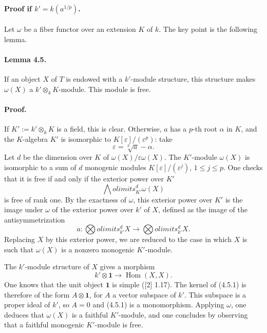 \documentclass[11pt]{article}
\newcommand{\Hom}{\operatorname{Hom}}
\newcommand{\one}{\mathbf{1}}
\theoremstyle{plain}
\theoremstyle{definition}
\begin{document}
\paragraph{Proof if $k'=k(a^{1/p})$.} Let $\omega$ be a fiber functor over an extension $K$ of $k$. The key point is the following lemma.

\paragraph{Lemma 4.5.} If an object $X$ of $T$ is endowed with a $k'$-module structure, this structure makes $\omega(X)$ a $k'\otimes_kK$-module. This module is free.

\paragraph{Proof.} If $K':=k'\otimes_kK$ is a field, this is clear. Otherwise, $a$ has a $p$-th root $\alpha$ in $K$, and the $K$-algebra $K'$ is isomorphic to $K[\varepsilon]/(\varepsilon^p)$: take
\[
   \varepsilon=\sqrt[p]{a}-\alpha.
\]
Let $d$ be the dimension over $K$ of $\omega(X)/\varepsilon\omega(X)$. The $K'$-module $\omega(X)$ is isomorphic to a sum of $d$ monogenic modules $K[\varepsilon]/(\varepsilon^j)$, $1\le j\le p$. One checks that it is free if and only if the exterior power over $K'$
\[
   \bigwedge
olimits^d_{K'}\omega(X)
\]
is free of rank one. By the exactness of $\omega$, this exterior power over $K'$ is the image under $\omega$ of the exterior power over $k'$ of $X$, defined as the image of the antisymmetrization
\[
   a:\bigotimes
olimits^d_{k'}X\longrightarrow\bigotimes
olimits^d_{k'}X.
\]
Replacing $X$ by this exterior power, we are reduced to the case in which $X$ is such that $\omega(X)$ is a nonzero monogenic $K'$-module.

The $k'$-module structure of $X$ gives a morphism
\begin{equation}\tag{4.5.1}
   k'\otimes\one\longrightarrow\Hom(X,X).
\end{equation}
One knows that the unit object $\one$ is simple ([2] 1.17). The kernel of (4.5.1) is therefore of the form $A\otimes\one$, for $A$ a vector subspace of $k'$. This subspace is a proper ideal of $k'$, so $A=0$ and (4.5.1) is a monomorphism. Applying $\omega$, one deduces that $\omega(X)$ is a faithful $K'$-module, and one concludes by observing that a faithful monogenic $K'$-module is free.
\end{document}
